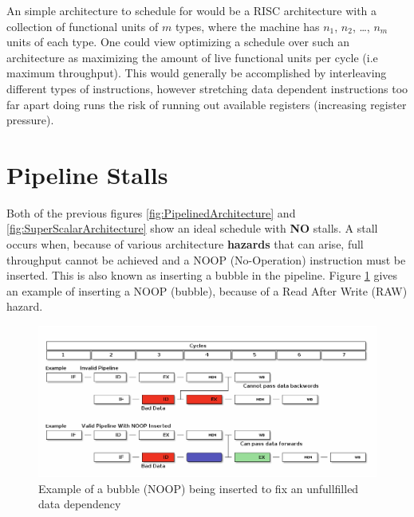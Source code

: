 \documentclass[12pt]{report}
\begin{document}
An simple architecture to schedule for would be a RISC architecture with
a collection of functional units of \(m\) types, where the machine has \(n_1\),
\(n_2\), \ldots{}, \(n_m\) units of each type. One could view optimizing a schedule over such
an architecture as maximizing the amount of live functional units per
cycle (i.e maximum throughput). This would generally be accomplished by
interleaving different types of instructions, however stretching data
dependent instructions too far apart doing runs the risk of running out 
available registers (increasing register pressure). 

\section{Pipeline Stalls}
\label{sec:orgc330492}
Both of the previous figures \ref{fig:PipelinedArchitecture} and
\ref{fig:SuperScalarArchitecture} show an ideal schedule with \textbf{NO} stalls. A stall
occurs when, because of various architecture \textbf{hazards} that can arise, full throughput
cannot be achieved and a NOOP (No-Operation) instruction must be inserted.
This is also known as inserting a bubble in the pipeline.
Figure \ref{fig:PipelineStall} gives an example of inserting a NOOP (bubble),
because of a Read After Write (RAW) hazard.

\begin{figure}[htbp]
\centering
\includegraphics[width=1.0\textwidth]{figures/PipelineStall.png}
\caption{\label{fig:PipelineStall}Example of a bubble (NOOP) being inserted to fix an unfullfilled data dependency}
\end{figure}
\end{document}
